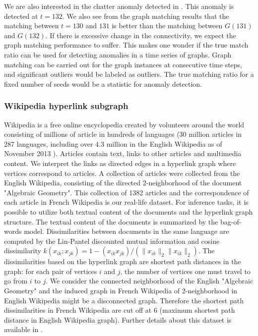 \documentclass[12pt,oneside,final]{thesis}\usepackage[]{graphicx}\usepackage[]{color}
\begin{document}
We are also interested in the chatter anomaly detected in \cite{EnronStudy}. This anomaly is detected at $t=132$. We also see from the graph matching results that the matching between $t=130$ and $131$ is better than the matching between $G(131)$ and $G(132)$. If there is excessive change in the connectivity, we expect the graph matching performance to suffer. This makes one wonder if the true match ratio can be used for detecting anomalies in a time series of graphs. Graph matching can be carried out for the graph instances at consecutive time steps, and significant outliers would be labeled as outliers. The true matching ratio  for a fixed number of seeds would be a statistic for anomaly detection. 

\subsubsection{Wikipedia hyperlink subgraph}

Wikipedia is a free online encyclopedia created by volunteers around the world consisting of millions of article in hundreds of languages (30 million articles in 287 languages, including over 4.3 million in the English Wikipedia as of November 2013 \cite{wikipedia}). Articles contain text, links to other articles and multimedia content. We interpret the links as directed edges in a hyperlink graph where vertices correspond to articles. A collection of articles were collected from the English Wikipedia, consisting of the
 directed 2-neighborhood of the document "Algebraic Geometry"\cite{wikiwebpage}. 
   This  collection of 1382 articles and the correspondence of each article in French 
Wikipedia is our real-life dataset. For inference tasks, it is possible to utilize both textual content of the documents and the hyperlink graph structure. The textual content of the documents is summarized by the bag-of-words model. Dissimilarities between documents  in the same language are computed by the Lin-Pantel discounted mutual information \cite{LinPantel,PantelLin}
 and cosine dissimilarity $k(x_{ik}; x_{jk}) = 1 - (x_{ik} x_{jk})/(\|x_{ik}\|_2\|x_{ik}\|_2)$. 
 The dissimilarities based on the hyperlink graph are shortest path distances in the graph:
 for each pair of vertices $i$ and $j$, the number of vertices one must travel to go from $i$ to $j$. We consider the connected neighborhood of the English  "Algebraic Geometry" and the induced graph in French Wikipedia of 2-neighborhood in English Wikipedia might be a disconnected graph. Therefore the shortest path dissimilarities in French Wikipedia are cut off at 6 (maximum shortest path distance in English Wikipedia graph).  Further details about this dataset is available in \cite{Zhiliang_disparate}.
 
\end{document}
